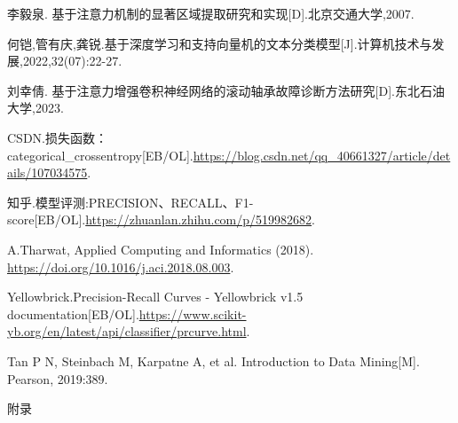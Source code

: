 \documentclass{MathorCupmodeling}
\begin{document}
\begin{spacing}{1.08}
\begin{thebibliography}{99}
	李毅泉. 基于注意力机制的显著区域提取研究和实现[D].北京交通大学,2007.

	何铠,管有庆,龚锐.基于深度学习和支持向量机的文本分类模型[J].计算机技术与发展,2022,32(07):22-27.

	刘幸倩. 基于注意力增强卷积神经网络的滚动轴承故障诊断方法研究[D].东北石油大学,2023.

	CSDN.损失函数：categorical\_crossentropy[EB/OL].\url{https://blog.csdn.net/qq_40661327/article/details/107034575}.

	知乎.模型评测:PRECISION、RECALL、F1-score[EB/OL].\url{https://zhuanlan.zhihu.com/p/519982682}.

	A.Tharwat, Applied Computing and Informatics (2018). \url{https://doi.org/10.1016/j.aci.2018.08.003}.

	Yellowbrick.Precision-Recall Curves - Yellowbrick v1.5 documentation[EB/OL].\url{https://www.scikit-yb.org/en/latest/api/classifier/prcurve.html}.

	Tan P N, Steinbach M, Karpatne A, et al. Introduction to Data Mining[M]. Pearson, 2019:389.
	\end{thebibliography}
	\end{spacing}
	\newpage


	\begin{center}
		\heiti{} 附\hspace{2pc}录
	\end{center}

	~\\
\end{document}
